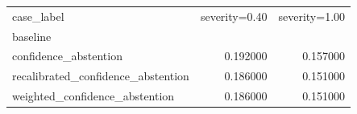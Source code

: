 \begin{tabular}{lrr}
\toprule
case_label & severity=0.40 & severity=1.00 \\
baseline &  &  \\
\midrule
confidence_abstention & 0.192000 & 0.157000 \\
recalibrated_confidence_abstention & 0.186000 & 0.151000 \\
weighted_confidence_abstention & 0.186000 & 0.151000 \\
\bottomrule
\end{tabular}
